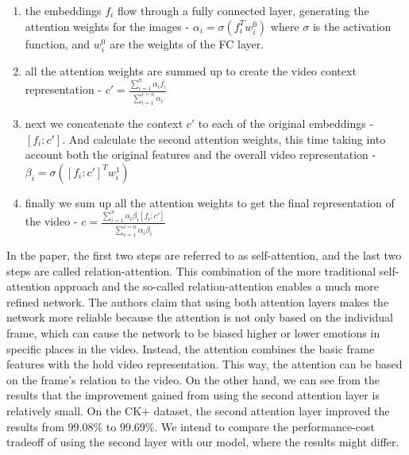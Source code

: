 \documentclass[../main.tex]{subfiles}
\begin{document}
\begin{enumerate}
    \item the embeddings $f_i$ flow through a fully connected layer, generating the attention weights for the images - $\alpha_i = \sigma(f_i^Tw_i^0)$
        where $\sigma$ is the activation function, and $w_i^0$ are the weights of the FC layer.
    \item all the attention weights are summed up to create the video context representation - $c'=\frac{\sum_{i=1}^{n}\alpha_if_i}{\sum_{i=1}^{i=n}\alpha_i}$
    \item next we concatenate the context $c'$ to each of the original embeddings - $[f_i:c']$. And calculate the second attention weights, this time 
        taking into account both the original features and the overall video representation - $\beta_i = \sigma([f_i:c']^Tw_i^1)$
    \item finally we sum up all the attention weights to get the final representation of the video - 
    $c = \frac{\sum_{i=1}^{n}\alpha_i\beta_i[f_i:c']}{\sum_{i=1}^{i=n}\alpha_i\beta_i}$
\end{enumerate}

In the paper, the first two steps are referred to as self-attention, and the last two steps are called relation-attention.
This combination of the more traditional self-attention approach and the so-called relation-attention enables a much more refined network.
The authors claim that using both attention layers makes the network more reliable because the attention is not only based on the individual frame,
which can cause the network to be biased higher or lower emotions in specific places in the video. Instead, the attention combines the basic frame
features with the hold video representation. This way, the attention can be based on the frame's relation to the video.
On the other hand, we can see from the results that the improvement gained from using the second attention layer is relatively small. On the CK+ dataset,
the second attention layer improved the results from 99.08\% to 99.69\%. We intend to compare the performance-cost tradeoff of
using the second layer with our model, where the results might differ.
\end{document}
